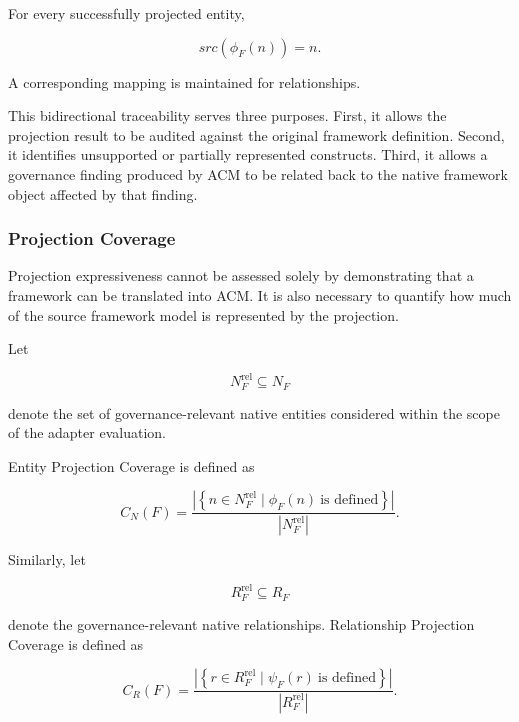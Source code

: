 \documentclass[10pt]{article}
\begin{document}
For every successfully projected entity,

\begin{equation}
src(\phi_F(n))=n.
\end{equation}

A corresponding mapping is maintained for relationships.

This bidirectional traceability serves three purposes. First, it allows the
projection result to be audited against the original framework definition.
Second, it identifies unsupported or partially represented constructs. Third,
it allows a governance finding produced by ACM to be related back to the native
framework object affected by that finding.

\subsubsection{Projection Coverage}

Projection expressiveness cannot be assessed solely by demonstrating that a
framework can be translated into ACM. It is also necessary to quantify how much
of the source framework model is represented by the projection.

Let

\begin{equation}
N_F^{\mathrm{rel}}
\subseteq
N_F
\end{equation}

denote the set of governance-relevant native entities considered within the
scope of the adapter evaluation.

Entity Projection Coverage is defined as

\begin{equation}
C_N(F)
=
\frac{
	\left|
	\left\{
	n\in N_F^{\mathrm{rel}}
	\mid
	\phi_F(n)\ \text{is defined}
	\right\}
	\right|
}{
	|N_F^{\mathrm{rel}}|
}.
\end{equation}

Similarly, let

\begin{equation}
R_F^{\mathrm{rel}}
\subseteq
R_F
\end{equation}

denote the governance-relevant native relationships. Relationship Projection
Coverage is defined as

\begin{equation}
C_R(F)
=
\frac{
	\left|
	\left\{
	r\in R_F^{\mathrm{rel}}
	\mid
	\psi_F(r)\ \text{is defined}
	\right\}
	\right|
}{
	|R_F^{\mathrm{rel}}|
}.
\end{equation}
\end{document}
